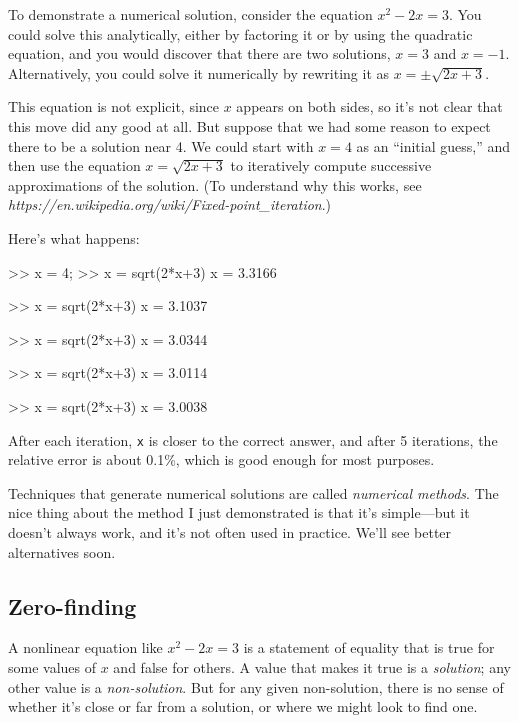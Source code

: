 
To demonstrate a numerical solution, consider the equation $x^2 - 2x =
3$.  You could solve this analytically, either by factoring it or by
using the quadratic equation, and you would discover that there are
two solutions, $x=3$ and $x=-1$.  Alternatively, you could solve it
numerically by rewriting it as $x = \pm \sqrt{2x+3}$.

This equation is not explicit, since $x$ appears on both sides, so
it's not clear that this move did any good at all.  But suppose
that we had some reason to expect there to be a solution near 4.
We could start with $x=4$ as an ``initial guess,'' and then use
the equation $x = \sqrt{2x+3}$ to iteratively compute successive
approximations of the solution. (To understand why this
works, see \emph{https://en.wikipedia.org/wiki/Fixed-point\_iteration}.)


Here's what happens:

\begin{code}
>> x = 4;
>> x = sqrt(2*x+3)
x = 3.3166

>> x = sqrt(2*x+3)
x = 3.1037

>> x = sqrt(2*x+3)
x = 3.0344

>> x = sqrt(2*x+3)
x = 3.0114

>> x = sqrt(2*x+3)
x = 3.0038
\end{code}

After each iteration, {\tt x} is closer to the correct answer,
and after 5 iterations, the relative error is about 0.1\%, which
is good enough for most purposes.


Techniques that generate numerical solutions are called
\emph{numerical methods}.  
The nice thing about the method I
just demonstrated is that it's simple---but it doesn't always
work, and it's not often used in practice.
We'll see better alternatives soon.

\subsection{Zero-finding}
\label{zero}

A nonlinear equation like $x^2 - 2x = 3$ is a statement of
equality that is true for some values of $x$ and false for
others.  A value that makes it true is a \emph{solution};
any other value is a \emph{non-solution}.  But for any given non-solution,
there is no sense of whether it's close or far from a solution,
or where we might look to find one.


